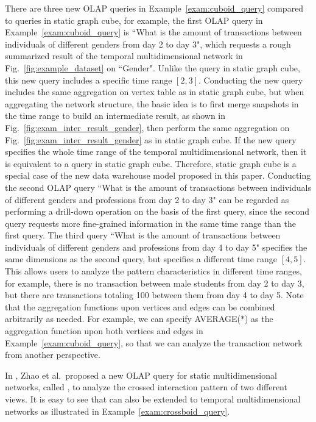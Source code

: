 \documentclass[10pt,journal,compsoc]{IEEEtran}
\begin{document}
{There are three new OLAP queries in Example~\ref{exam:cuboid_query} compared to queries in static graph cube, for example, the first OLAP query in Example~\ref{exam:cuboid_query} is ``What is the amount of transactions between individuals of different genders from day 2 to day 3", which requests a rough summarized result of the temporal multidimensional network in Fig.~\ref{fig:example_dataset} on ``Gender". Unlike the query in static graph cube, this new query includes a specific time range $ [2,3] $. Conducting the new query includes the same aggregation on vertex table as in static graph cube, but when aggregating the network structure, the basic idea is to first merge snapshots in the time range to build an intermediate result, as shown in Fig.~\ref{fig:exam_inter_result_gender}, then perform the same aggregation on Fig.~\ref{fig:exam_inter_result_gender} as in static graph cube. If the new query specifies the whole time range of the temporal multidimensional network, then it is equivalent to a query in static graph cube. Therefore, static graph cube is a special case of the new data warehouse model proposed in this paper. Conducting the second OLAP query ``What is the amount of transactions between individuals of different genders and professions from day 2 to day 3" can be regarded as performing a drill-down operation on the basis of the first query, since the second query requests more fine-grained information in the same time range than the first query. The third query ``What is the amount of transactions between individuals of different genders and professions from day 4 to day 5" specifies the same dimensions as the second query, but specifies a different time range $ [4,5] $. This allows users to analyze the pattern characteristics in different time ranges, for example, there is no transaction between male students from day 2 to day 3, but there are transactions totaling 100 between them from day 4 to day 5. Note that the aggregation functions upon vertices and edges can be combined arbitrarily as needed. For example, we can specify AVERAGE($\ast$) as the aggregation function upon both vertices and edges in Example~\ref{exam:cuboid_query}, so that we can analyze the transaction network from another perspective.

In \cite{zhao2011graph}, Zhao et al.\ proposed a new OLAP query for static multidimensional networks, called , to analyze the crossed interaction pattern of two different views. It is easy to see that  can also be extended to temporal multidimensional networks as illustrated in Example~\ref{exam:crossboid_query}.

}
\end{document}

